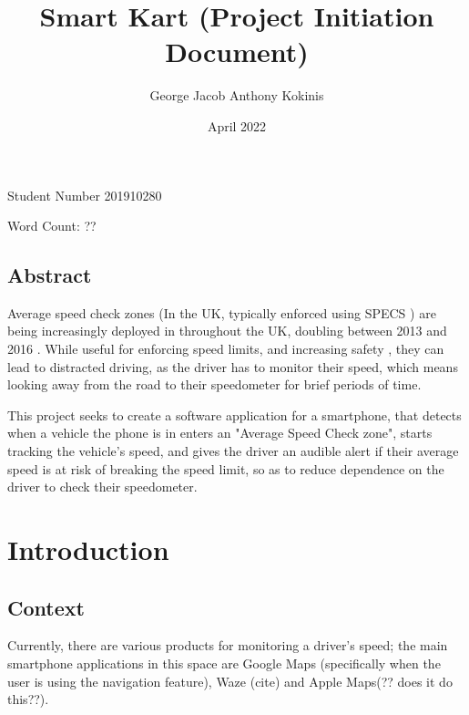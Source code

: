 \documentclass[11pt, a4paper, notitlepage]{report}
\title{Smart Kart (Project Initiation Document)}
\date{April 2022}
\author{George Jacob Anthony Kokinis}
\begin{document}
\maketitle
\begin{center}
    Student Number 201910280
    
    Word Count: ?? %
\end{center}
\newpage

\tableofcontents

\section{Abstract}
Average speed check zones (In the UK, typically enforced using SPECS \citep{specsjenop}) are being increasingly deployed in throughout the UK, doubling between 2013 and 2016 \citep{BBCSpeedCameraDoubled}. While useful for enforcing speed limits, and increasing safety \citep{owenAllsop}, they can lead to distracted driving, as the driver has to monitor their speed, which means looking away from the road to their speedometer for brief periods of time.

This project seeks to create a software application for a smartphone, that detects when a vehicle the phone is in enters an "Average Speed Check zone", starts tracking the vehicle's speed, and gives the driver an audible alert if their average speed is at risk of breaking the speed limit, so as to reduce dependence on the driver to check their speedometer.

\chapter{Introduction}
\section{Context}
Currently, there are various products for monitoring a driver's speed; the main smartphone applications in this space are Google Maps \citep{googleMaps} (specifically when the user is using the navigation feature), Waze (cite) and Apple Maps(?? does it do this??).




\end{document}
